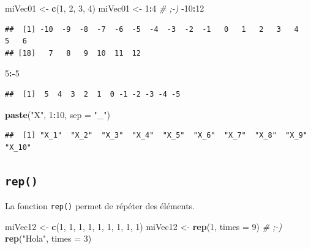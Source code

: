 \documentclass[]{book}
\newenvironment{Shaded}{\begin{snugshade}}{\end{snugshade}}
\newcommand{\CommentTok}[1]{\textcolor[rgb]{0.56,0.35,0.01}{\textit{#1}}}
\newcommand{\DataTypeTok}[1]{\textcolor[rgb]{0.13,0.29,0.53}{#1}}
\newcommand{\DecValTok}[1]{\textcolor[rgb]{0.00,0.00,0.81}{#1}}
\newcommand{\KeywordTok}[1]{\textcolor[rgb]{0.13,0.29,0.53}{\textbf{#1}}}
\newcommand{\NormalTok}[1]{#1}
\newcommand{\OperatorTok}[1]{\textcolor[rgb]{0.81,0.36,0.00}{\textbf{#1}}}
\newcommand{\StringTok}[1]{\textcolor[rgb]{0.31,0.60,0.02}{#1}}
\begin{document}
\begin{Shaded}
\begin{Highlighting}[]
\NormalTok{miVec01 <-}\StringTok{ }\KeywordTok{c}\NormalTok{(}\DecValTok{1}\NormalTok{, }\DecValTok{2}\NormalTok{, }\DecValTok{3}\NormalTok{, }\DecValTok{4}\NormalTok{)}
\NormalTok{miVec01 <-}\StringTok{ }\DecValTok{1}\OperatorTok{:}\DecValTok{4} \CommentTok{# ;-)}
\DecValTok{-10}\OperatorTok{:}\DecValTok{12}
\end{Highlighting}
\end{Shaded}

\begin{verbatim}
##  [1] -10  -9  -8  -7  -6  -5  -4  -3  -2  -1   0   1   2   3   4   5   6
## [18]   7   8   9  10  11  12
\end{verbatim}

\begin{Shaded}
\begin{Highlighting}[]
\DecValTok{5}\OperatorTok{:-}\DecValTok{5}
\end{Highlighting}
\end{Shaded}

\begin{verbatim}
##  [1]  5  4  3  2  1  0 -1 -2 -3 -4 -5
\end{verbatim}

\begin{Shaded}
\begin{Highlighting}[]
\KeywordTok{paste}\NormalTok{(}\StringTok{"X"}\NormalTok{, }\DecValTok{1}\OperatorTok{:}\DecValTok{10}\NormalTok{, }\DataTypeTok{sep =} \StringTok{"_"}\NormalTok{)}
\end{Highlighting}
\end{Shaded}

\begin{verbatim}
##  [1] "X_1"  "X_2"  "X_3"  "X_4"  "X_5"  "X_6"  "X_7"  "X_8"  "X_9"  "X_10"
\end{verbatim}

\hypertarget{l015rep}{%
\subsection{\texorpdfstring{\texttt{rep()}}{rep()}}\label{l015rep}}

La fonction \texttt{rep()} permet de répéter des éléments.

\begin{Shaded}
\begin{Highlighting}[]
\NormalTok{miVec12 <-}\StringTok{ }\KeywordTok{c}\NormalTok{(}\DecValTok{1}\NormalTok{, }\DecValTok{1}\NormalTok{, }\DecValTok{1}\NormalTok{, }\DecValTok{1}\NormalTok{, }\DecValTok{1}\NormalTok{, }\DecValTok{1}\NormalTok{, }\DecValTok{1}\NormalTok{, }\DecValTok{1}\NormalTok{, }\DecValTok{1}\NormalTok{)}
\NormalTok{miVec12 <-}\StringTok{ }\KeywordTok{rep}\NormalTok{(}\DecValTok{1}\NormalTok{, }\DataTypeTok{times =} \DecValTok{9}\NormalTok{) }\CommentTok{# ;-)}
\KeywordTok{rep}\NormalTok{(}\StringTok{"Hola"}\NormalTok{, }\DataTypeTok{times =} \DecValTok{3}\NormalTok{)}
\end{Highlighting}
\end{Shaded}
\end{document}

